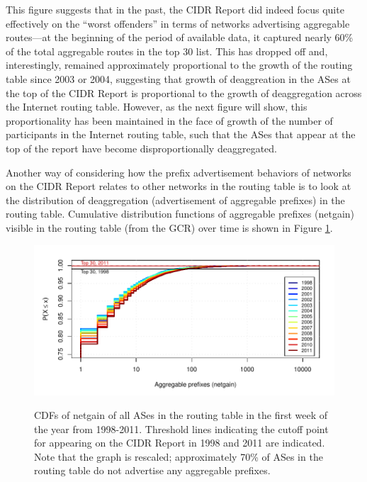 This figure suggests that in the past, the CIDR Report did indeed focus quite
effectively on the ``worst offenders'' in terms of networks advertising
aggregable routes---at the beginning of the period of available data, it
captured nearly 60\% of the total aggregable routes in the top 30 list. This
has dropped off and, interestingly, remained approximately proportional to the
growth of the routing table since 2003 or 2004, suggesting that growth of
deaggreation in the ASes at the top of the CIDR Report is proportional to the
growth of deaggregation across the Internet routing table. However, as the next
figure will show, this proportionality has been maintained in the face of
growth of the number of participants in the Internet routing table, such that
the ASes that appear at the top of the report have become disproportionally
deaggregated.

Another way of considering how the prefix advertisement behaviors of networks
on the CIDR Report relates to other networks in the routing table is to look at
the distribution of deaggregation (advertisement of aggregable prefixes) in the
routing table. Cumulative distribution functions of aggregable prefixes
(netgain) visible in the routing table (from the GCR) over time is shown in
Figure \ref{fig:netgain_cdf}.

\begin{figure}[h!]
\begin{centering}
\begin{singlespace}
    \includegraphics[width=6in]{figures/netgain_cdf_gcr.pdf}
    \vspace{-2em}\\
    \caption{CDFs of netgain of all ASes in the routing table in the first week
    of the year from 1998-2011. Threshold lines indicating the cutoff point for
    appearing on the CIDR Report in 1998 and 2011 are indicated. Note that the
    graph is rescaled; approximately 70\% of ASes in the routing table do not
    advertise any aggregable prefixes.}
    \label{fig:netgain_cdf}
\end{singlespace}
\end{centering}
\end{figure}

